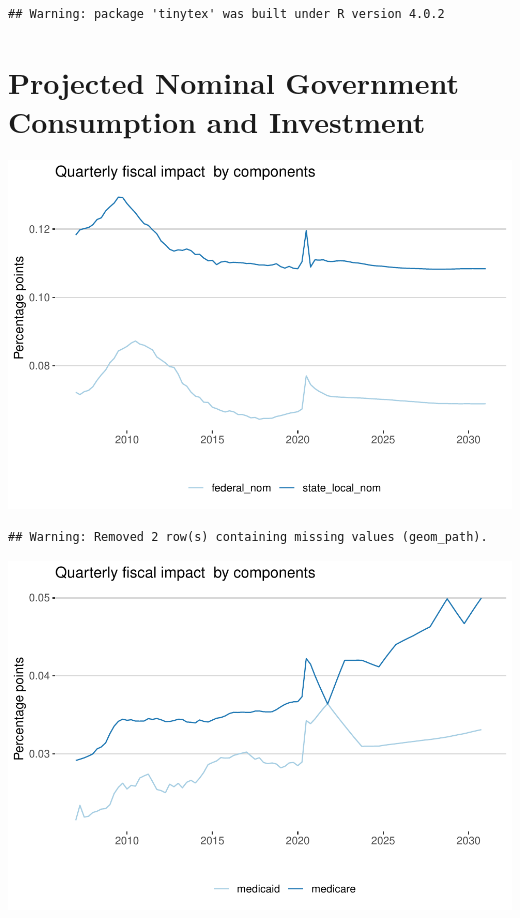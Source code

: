 \documentclass[
]{article}
\begin{document}
\begin{verbatim}
## Warning: package 'tinytex' was built under R version 4.0.2
\end{verbatim}

\hypertarget{projected-nominal-government-consumption-and-investment}{%
\section{Projected Nominal Government Consumption and
Investment}\label{projected-nominal-government-consumption-and-investment}}

\begin{center}\includegraphics{projections_files/figure-latex/consumption and investment-1} \end{center}

\begin{verbatim}
## Warning: Removed 2 row(s) containing missing values (geom_path).
\end{verbatim}

\begin{center}\includegraphics{projections_files/figure-latex/health-1} \end{center}
\end{document}

